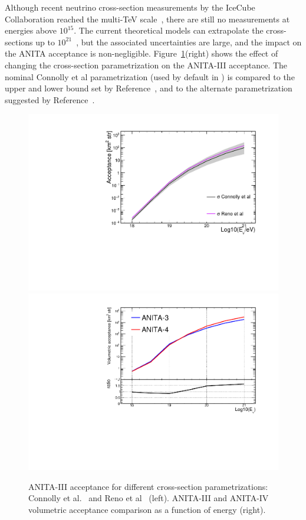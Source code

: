 Although recent neutrino cross-section measurements by the IceCube
Collaboration reached the multi-TeV
scale~\cite{aartsen2017measurement,bustamante2017measurement}, there
are still no measurements at energies above $10^{15}$\ev.
The current theoretical models can extrapolate the cross-sections up to $10^{21}$\ev~\cite{PhysRevD.83.113009,reno2005high},
but the associated uncertainties are
large, and the impact on the ANITA acceptance is
non-negligible.
Figure~\ref{fig:acceptanceVSxsec}(right) shows the effect of changing the
cross-section parametrization on the ANITA-III acceptance.
The nominal Connolly et al parametrization (used by default in
\icemc) is compared to the upper and lower bound set by
Reference~\cite{PhysRevD.83.113009}, and to the alternate
parametrization suggested by Reference~\cite{reno2005high}.


\begin{figure}[!h]\centering
  \includegraphics[width=.45\linewidth]{./Figs/AcceptanceVScrossSectionParam_ANITA3.pdf}
  \includegraphics[width=.45\linewidth]{./Figs/CompareEffVol_A3vsA4.pdf}
  \caption{ANITA-III acceptance for different cross-section parametrizations: Connolly et al.~\cite{PhysRevD.83.113009} and Reno et al~\cite{reno2005high} (left). ANITA-III and ANITA-IV volumetric acceptance comparison as a function of energy (right).}
  \label{fig:acceptanceVSxsec}
\end{figure}


